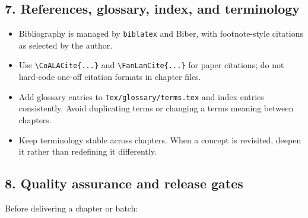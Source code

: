 \subsection{7. References, glossary, index, and
terminology}\label{7-references-glossary-index-and-terminology}

\begin{itemize}
\tightlist
\item
  Bibliography is managed by \texttt{biblatex} and Biber, with
  footnote-style citations as selected by the author.
\item
  Use \texttt{\textbackslash{}CoALACite\{...\}} and
  \texttt{\textbackslash{}FanLanCite\{...\}} for paper citations; do not
  hard-code one-off citation formats in chapter files.
\item
  Add glossary entries to \texttt{Tex/glossary/terms.tex} and index
  entries consistently. Avoid duplicating terms or changing a
  term\textquotesingle s meaning between chapters.
\item
  Keep terminology stable across chapters. When a concept is revisited,
  deepen it rather than redefining it differently.
\end{itemize}

\subsection{8. Quality assurance and release
gates}\label{8-quality-assurance-and-release-gates}

Before delivering a chapter or batch:

